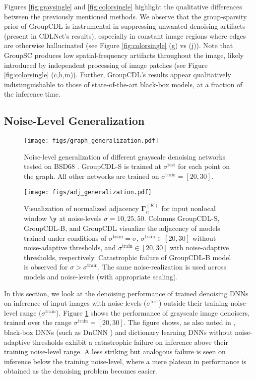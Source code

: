 \documentclass[lettersize,journal]{IEEEtran}
\newcommand{\soa}{state-of-the-art }
\newcommand{\sigmatrain}{\sigma^{\mathrm{train}}}
\newcommand{\sigmatest}{\sigma^{\mathrm{test}}}
\newcommand{\ADJMAT}{\boldsymbol{\Gamma}}
\begin{document}
Figures \ref{fig:graysingle} and \ref{fig:colorsingle} highlight the qualitative differences between the previously mentioned methods. We observe that the group-sparsity
prior of GroupCDL is instrumental in suppressing unwanted denoising artifacts (present in CDLNet's results),
especially in constant image regions where edges are otherwise hallucinated (see Figure \ref{fig:colorsingle} (g) vs (j)). Note that GroupSC produces low spatial-frequency artifacts throughout the image, likely introduced by independent processing of image patches (see Figure \ref{fig:colorsingle} (c,h,m)). Further, GroupCDL's results appear qualitatively indistinguishable to those of \soa black-box models, at a fraction of the inference time.

\subsection{Noise-Level Generalization}
\begin{figure}
    \centering
    \texttt{[image: figs/graph\_generalization.pdf]}
    \caption{Noise-level generalization of different grayscale denoising
    networks tested on BSD68 \cite{bsd}. GroupCDL-S is trained at $\sigmatest$ 
    for each point on the graph. All other networks are trained on $\sigmatrain
    =[20, 30]$.}
    \label{fig:generalization}
\end{figure}\begin{figure}[tbh]
    \centering
    \texttt{[image: figs/adj\_generalization.pdf]}
    \caption{
        Visualization of normalized adjacency $\ADJMAT^{(K)}_{i:}$ for input
        nonlocal window $\y$ at noise-levels $\sigma=10,25,50$. Columns
        GroupCDL-S, GroupCDL-B, and GroupCDL
        visualize the adjacency of models trained under conditions of
        $\sigmatrain=\sigma$, $\sigmatrain \in [20,30]$ without noise-adaptive
        thresholds, and $\sigmatrain \in [20,30]$ with noise-adaptive
        thresholds, respectively. Catastrophic failure of GroupCDL-B model is
        observed for $\sigma > \sigmatrain$. The same noise-realization is used
        across models and noise-levels (with appropriate scaling). 
    }
    \label{fig:adj_gen}
\end{figure}In this section, we look at the denoising performance of trained denoising DNNs 
on inference of input images with noise-levels ($\sigmatest$) outside their
training noise-level range ($\sigmatrain$). Figure \ref{fig:generalization}
shows the performance of grayscale image denoisers, trained over the range
$\sigmatrain = [20,30]$. The figure shows, as also noted in \cite{Mohan2020, janjusevicCDLNet2022,
janjusevicGDLNet2022}, black-box DNNs (such as DnCNN \cite{DnCNN}) and dictionary
learning DNNs without noise-adaptive thresholds exhibit a catastrophic failure
on inference above their training noise-level range. A less striking but
analogous failure is seen on inference below the training noise-level,
where a mere plateau in performance is obtained as the denoising problem becomes
easier. 
\end{document}
